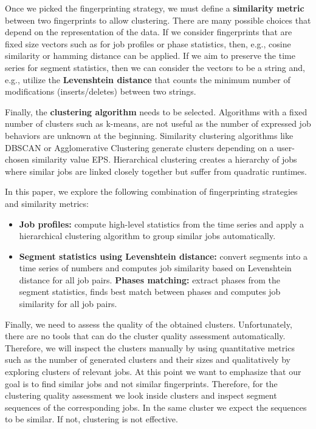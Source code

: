 \documentclass[]{llncs}
\begin{document}
Once we picked the fingerprinting strategy, we must define a \textbf{similarity metric} between two fingerprints to allow clustering.
There are many possible choices that depend on the representation of the data.
If we consider fingerprints that are fixed size vectors such as for job profiles or phase statistics, then, e.g., cosine similarity or hamming distance can be applied.
If we aim to preserve the time series for segment statistics, then we can consider the vectors to be a string and, e.g., utilize the \textbf{Levenshtein distance} that counts the minimum number of modifications (inserts/deletes) between two strings.

Finally, the \textbf{clustering algorithm} needs to be selected.
Algorithms with a fixed number of clusters such as k-means, are not useful as the number of expressed job behaviors are unknown at the beginning.
Similarity clustering algorithms like DBSCAN or Agglomerative Clustering generate clusters depending on a user-chosen similarity value EPS.
Hierarchical clustering creates a hierarchy of jobs where similar jobs are linked closely together but suffer from quadratic runtimes.

In this paper, we explore the following combination of fingerprinting strategies and similarity metrics:

\begin{itemize}
	\item \textbf{Job profiles:} compute high-level statistics from the time series and apply a hierarchical clustering algorithm to group similar jobs automatically.
	\item \textbf{Segment statistics using Levenshtein distance:} convert segments into a time series of numbers and computes job similarity based on Levenshtein distance for all job pairs.
		\textbf{Phases matching:} extract phases from the segment statistics, finds best match between phases and computes job similarity for all job pairs.
\end{itemize}

Finally, we need to assess the quality of the obtained clusters.
Unfortunately, there are no tools that can do the cluster quality assessment automatically.
Therefore, we will inspect the clusters manually by using quantitative metrics such as the number of generated clusters and their sizes and qualitatively by exploring clusters of relevant jobs.
At this point we want to emphasize that our goal is to find similar jobs and not similar fingerprints.
Therefore, for the clustering quality assessment we look inside clusters and inspect segment sequences of the corresponding jobs.
In the same cluster we expect the sequences to be similar.
If not, clustering is not effective.
\end{document}
